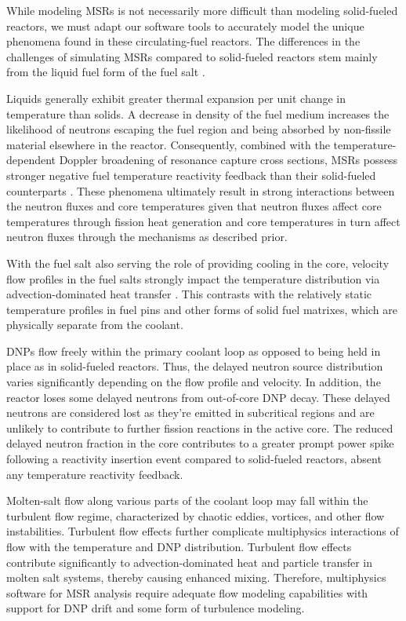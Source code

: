 While modeling \glspl{MSR} is not necessarily more difficult than modeling
solid-fueled reactors, we must adapt our software tools to accurately model the
unique phenomena found in these circulating-fuel reactors. The differences in
the challenges of simulating \glspl{MSR} compared to solid-fueled reactors stem
mainly from the liquid fuel form of the fuel salt \cite{diamond_phenomena_2018,
huff_identifying_2019}.

Liquids generally exhibit greater thermal
expansion per unit change in temperature than solids. A decrease in density of
the fuel medium increases the likelihood of neutrons escaping the fuel region
and being absorbed by non-fissile material elsewhere in the reactor.
Consequently, combined with the temperature-dependent Doppler broadening of
resonance capture cross sections, \glspl{MSR} possess stronger negative fuel
temperature reactivity feedback than their solid-fueled counterparts
\cite{elsheikh_safety_2013}. These
phenomena ultimately result in strong interactions between the neutron fluxes
and core temperatures given that neutron fluxes affect core temperatures
through fission heat generation and core temperatures in turn affect neutron
fluxes through the mechanisms as described prior.

With the fuel
salt also serving the role of providing cooling in the core, velocity flow
profiles in the fuel salts strongly impact the temperature distribution via
advection-dominated heat transfer \cite{diamond_phenomena_2018}. This contrasts
with the relatively static temperature profiles in fuel pins and
other forms of solid fuel matrixes, which are physically separate from the coolant.

\Glspl{DNP} flow freely within the primary coolant loop as opposed to
being held in place as in solid-fueled reactors. Thus, the delayed neutron
source distribution varies significantly depending on the flow profile and
velocity. In addition, the reactor loses some delayed neutrons from out-of-core
\gls{DNP} decay. These delayed neutrons are considered lost as they're emitted
in subcritical regions and are unlikely to contribute to further fission
reactions in the active core. The reduced delayed neutron fraction in the core
contributes to a greater prompt power spike following a reactivity insertion
event compared to solid-fueled reactors, absent any temperature reactivity
feedback.

Molten-salt flow along various parts of the coolant loop may fall within the turbulent flow
regime, characterized by chaotic eddies, vortices, and other flow instabilities.
Turbulent flow effects further complicate multiphysics interactions of flow with the temperature
and \gls{DNP} distribution. Turbulent flow effects contribute significantly to advection-dominated
heat and particle transfer in molten salt systems, thereby causing enhanced mixing. Therefore,
multiphysics software for \gls{MSR} analysis require adequate flow modeling capabilities with
support for \gls{DNP} drift and some form of turbulence modeling.

